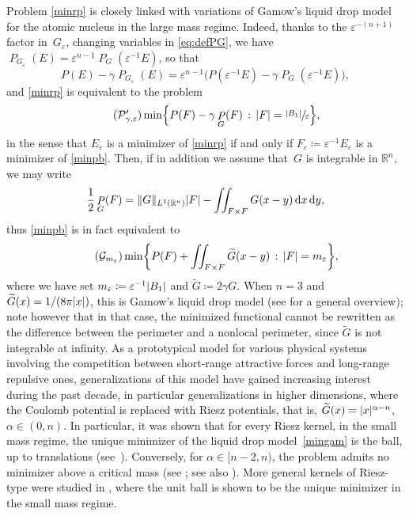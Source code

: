 \documentclass[JEP,XML,SOM,Unicode,published]{cedram}
\newcommand{\sep}{\,:\,}
\numberwithin{equation}{section}
\theoremstyle{plain}
\theoremstyle{definition}
\newcommand{\numberset}[1]{{\mathbb{#1}}}
\newcommand{\R}{\numberset{R}}
\newcommand{\dx}{\mathop{}\mathopen{}\mathrm{d}x}
\newcommand{\dy}{\mathop{}\mathopen{}\mathrm{d}y}
\let\eps\varepsilon
\let\wt\widetilde
\newcommand{\Ren}{{\R^n}}
\DeclareMathOperator{\Per}{\mathit{P}}
\DeclarePairedDelimiter{\abs}{\lvert}{\rvert}
\DeclarePairedDelimiter{\norm}{\lVert}{\rVert}
\begin{document}
Problem \cref{minrp} is closely linked with variations of Gamow's liquid drop model for the atomic
nucleus in the large mass regime. Indeed, thanks to the $\eps^{-(n+1)}$ factor in~$G_\eps$,
changing variables in \cref{eq:defPG}, we have $\Per_{G_\eps}(E)=\eps^{n-1}\Per_G(\eps^{-1}E)$, so
that
\[
P(E)-\gamma \Per_{G_\eps}(E) = \eps^{n-1}\big( P(\eps^{-1}E)-\gamma \Per_G(\eps^{-1}E)\big),
\]
and \cref{minrp} is equivalent to the problem
\begin{equation}\label{minpb}\tag{$\mathcal{P}'_{\gamma,\eps}$}
\min \Bigl\{ P(F)-\gamma\Per_{G}(F)\sep \abs{F}=\sfrac{\abs{B_1}}{\eps}\Bigr\},
\end{equation}
in the sense that $E_\eps$ is a minimizer of \cref{minrp} if and only if $F_\eps\coloneqq
\eps^{-1}E_\eps$ is a minimizer of \cref{minpb}.
Then, if in addition we assume that~$G$ is integrable in $\Ren$, we may write
\begin{equation}\label{eq:equivgamow}
\frac{1}{2}\Per_{G}(F) = \norm{G}_{L^1(\Ren)}\abs{F}-\iint_{F\times F} G(x-y)\dx\dy,
\end{equation}
thus \cref{minpb} is in fact equivalent to
\begin{equation}\label{mingam}\tag{$\mathcal{G}_{m_\eps}$}
\min \biggl\{ P(F)+\iint_{F\times F} \wt{G}(x-y)\sep  \abs{F}=m_\eps\biggr\},
\end{equation}
where we have set $m_\eps\coloneqq \eps^{-1}\abs{B_1}$ and $\wt{G}\coloneqq 2\gamma G$. When $n=3$
and $\wt{G}(x)=1/(8\pi\abs{x})$, this is Gamow's liquid drop model (see \cite{CMT2017} for a
general overview); note however that in that case, the minimized functional cannot be rewritten as
the difference between the perimeter and a nonlocal perimeter, since $\wt{G}$ is not integrable at
infinity.
As a prototypical model for various physical systems involving the competition between short-range
attractive forces and long-range repulsive ones, generalizations of this model have gained
increasing interest during the past decade, in particular generalizations in higher dimensions,
where the Coulomb potential is replaced with Riesz potentials, that is,
$\wt{G}(x)=\abs{x}^{\alpha-n}$, $\alpha\in(0,n)$.
In particular, it was shown that for every Riesz kernel, in the small mass regime, the
unique minimizer of the liquid drop model~\cref{mingam} is the ball, up to translations
(see~\cite{KM2013,KM2014,Jul2014,BC2014,FFM+2015}).
Conversely, for $\alpha\in [n-2,n)$, the problem admits no minimizer above a critical mass (see
\cite{BC2014,KM2013,KM2014,LO2014,FKN2016,FN2021}; see also \cite{FL2015}).
More general kernels of Riesz-type were studied \eg in \cite{CFP2020,NP2021,MW2021}, where the
unit ball is shown to be the unique minimizer in the small mass regime.
\end{document}
